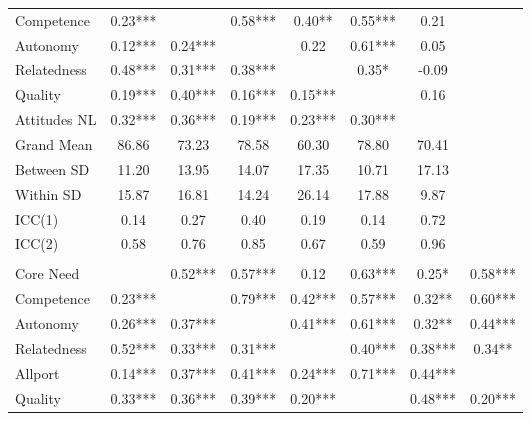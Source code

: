 \begin{table}
\begin{minipage}[t][\textheight][t]{\textwidth}
{\begin{tabular}[t]{lccccccc}
\hspace{1em}Competence & 0.23*** &  & 0.58*** & 0.40** & 0.55*** & 0.21 & \\
\hspace{1em}Autonomy & 0.12*** & 0.24*** &  & 0.22 & 0.61*** & 0.05 & \\
\hspace{1em}Relatedness & 0.48*** & 0.31*** & 0.38*** &  & 0.35* & -0.09 & \\
\hspace{1em}Quality & 0.19*** & 0.40*** & 0.16*** & 0.15*** &  & 0.16 & \\
\hspace{1em}Attitudes NL & 0.32*** & 0.36*** & 0.19*** & 0.23*** & 0.30*** &  & \\
\addlinespace
\hspace{1em}Grand Mean & 86.86 & 73.23 & 78.58 & 60.30 & 78.80 & 70.41 & \\
\hspace{1em}Between SD & 11.20 & 13.95 & 14.07 & 17.35 & 10.71 & 17.13 & \\
\hspace{1em}Within SD & 15.87 & 16.81 & 14.24 & 26.14 & 17.88 & 9.87 & \\
\hspace{1em}ICC(1) & 0.14 & 0.27 & 0.40 & 0.19 & 0.14 & 0.72 & \\
\hspace{1em}ICC(2) & 0.58 & 0.76 & 0.85 & 0.67 & 0.59 & 0.96 & \\
\addlinespace[0.3em]
\multicolumn{8}{l}{\textbf{Study 3}}\\
\hspace{1em}Core Need &  & 0.52*** & 0.57*** & 0.12 & 0.63*** & 0.25* & 0.58***\\
\hspace{1em}Competence & 0.23*** &  & 0.79*** & 0.42*** & 0.57*** & 0.32** & 0.60***\\
\hspace{1em}Autonomy & 0.26*** & 0.37*** &  & 0.41*** & 0.61*** & 0.32** & 0.44***\\
\hspace{1em}Relatedness & 0.52*** & 0.33*** & 0.31*** &  & 0.40*** & 0.38*** & 0.34**\\
\hspace{1em}Allport & 0.14*** & 0.37*** & 0.41*** & 0.24*** & 0.71*** & 0.44*** & \\
\hspace{1em}Quality & 0.33*** & 0.36*** & 0.39*** & 0.20*** &  & 0.48*** & 0.20***\\

\end{tabular}}
\end{minipage}
\end{table}
